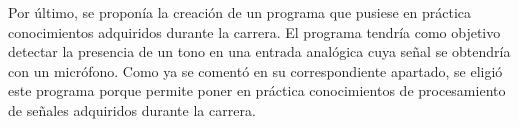 Por último, se proponía la creación de un programa que pusiese en práctica conocimientos adquiridos durante la carrera. El programa tendría como objetivo detectar la presencia de un tono en una entrada analógica cuya señal se obtendría con un micrófono. Como ya se comentó en su correspondiente apartado, se eligió este programa porque permite poner en práctica conocimientos de procesamiento de señales adquiridos durante la carrera. 
